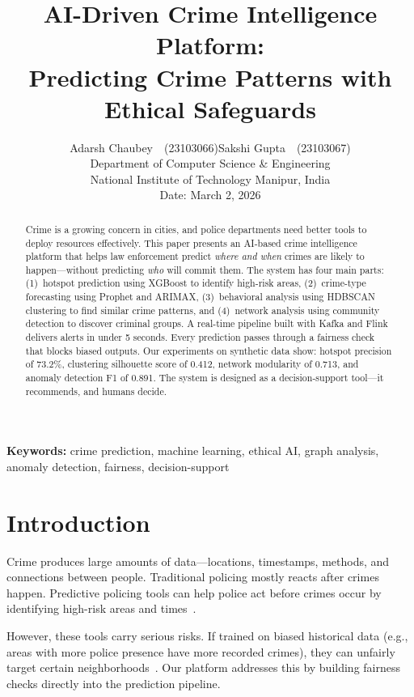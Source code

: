 \documentclass[a4paper,10pt,twocolumn]{article}
\title{\vspace{-1cm}\textbf{AI-Driven Crime Intelligence Platform:\\Predicting Crime Patterns with Ethical Safeguards}}
\author{
  Adarsh Chaubey~~(23103066)\quad Sakshi Gupta~~(23103067)\\[2pt]
  \small Department of Computer Science \& Engineering\\[-1pt]
  \small National Institute of Technology Manipur, India\\[2pt]
  \small Date: March 2, 2026
}
\date{}
\begin{document}
\maketitle
\thispagestyle{empty}

\begin{abstract}
Crime is a growing concern in cities, and police departments need better tools to deploy resources effectively. This paper presents an AI-based crime intelligence platform that helps law enforcement predict \emph{where and when} crimes are likely to happen---without predicting \emph{who} will commit them. The system has four main parts: (1)~hotspot prediction using XGBoost to identify high-risk areas, (2)~crime-type forecasting using Prophet and ARIMAX, (3)~behavioral analysis using HDBSCAN clustering to find similar crime patterns, and (4)~network analysis using community detection to discover criminal groups. A real-time pipeline built with Kafka and Flink delivers alerts in under 5 seconds. Every prediction passes through a fairness check that blocks biased outputs. Our experiments on synthetic data show: hotspot precision of 73.2\%, clustering silhouette score of 0.412, network modularity of 0.713, and anomaly detection F1 of 0.891. The system is designed as a decision-support tool---it recommends, and humans decide.
\end{abstract}

\smallskip
\noindent\textbf{Keywords:} crime prediction, machine learning, ethical AI, graph analysis, anomaly detection, fairness, decision-support

\section{Introduction}

Crime produces large amounts of data---locations, timestamps, methods, and connections between people. Traditional policing mostly reacts after crimes happen. Predictive policing tools can help police act before crimes occur by identifying high-risk areas and times~\cite{perry2013predictive,mohler2015randomized}.

However, these tools carry serious risks. If trained on biased historical data (e.g., areas with more police presence have more recorded crimes), they can unfairly target certain neighborhoods~\cite{lum2016predict,ensign2018runaway}. Our platform addresses this by building fairness checks directly into the prediction pipeline.
\end{document}
